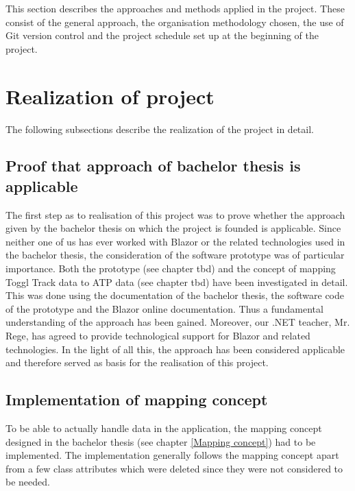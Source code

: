 
This section describes the approaches and methods applied in the project. These consist of the general approach, the organisation methodology chosen, the use of Git version control and the project schedule set up at the beginning of the project.

\section{Realization of project}
The following subsections describe the realization of the project in detail.

\subsection{Proof that approach of bachelor thesis is applicable}
The first step as to realisation of this project was to prove whether the approach given by the bachelor thesis on which the project is founded is applicable. Since neither one of us has ever worked with Blazor or the related technologies used in the bachelor thesis, the consideration of the software prototype was of particular importance. Both the prototype (see chapter tbd) and the concept of mapping Toggl Track data to ATP data (see chapter tbd) have been investigated in detail. This was done using the documentation of the bachelor thesis, the software code of the prototype and the Blazor online documentation. Thus a fundamental understanding of the approach has been gained. Moreover, our .NET teacher, Mr. Rege, has agreed to provide technological support for Blazor and related technologies. In the light of all this, the approach has been considered applicable and therefore served as basis for the realisation of this project.

\subsection{Implementation of mapping concept}
To be able to actually handle data in the application, the mapping concept designed in the bachelor thesis (see chapter \ref{Mapping concept}) had to be implemented. The implementation generally follows the mapping concept apart from a few class attributes which were deleted since they were not considered to be needed.

